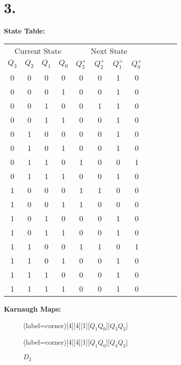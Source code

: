 \documentclass[a4paper,12pt]{article}
\begin{document}
\section*{3.}

\textbf{State Table:}

\begin{center}
	\begin{tabular}{cccccccccccc}
		\toprule
		\multicolumn{4}{c}{Current State} & \multicolumn{4}{c}{Next State} \\
		\cmidrule(lr){1-4} \cmidrule(lr){5-8}
		$Q_3$ & $Q_2$ & $Q_1$ & $Q_0$ & $Q_3^+$ & $Q_2^+$ & $Q_1^+$ & $Q_0^+$ \\
		\midrule
		0 & 0 & 0 & 0 & 0 & 0 & 1 & 0 \\ 
        0 & 0 & 0 & 1 & 0 & 0 & 1 & 0 \\ 
        0 & 0 & 1 & 0 & 0 & 1 & 1 & 0 \\ 
        0 & 0 & 1 & 1 & 0 & 0 & 1 & 0 \\ 
        0 & 1 & 0 & 0 & 0 & 0 & 1 & 0 \\ 
        0 & 1 & 0 & 1 & 0 & 0 & 1 & 0 \\ 
        0 & 1 & 1 & 0 & 1 & 0 & 0 & 1 \\ 
        0 & 1 & 1 & 1 & 0 & 0 & 1 & 0 \\ 
        1 & 0 & 0 & 0 & 1 & 1 & 0 & 0 \\ 
        1 & 0 & 0 & 1 & 1 & 0 & 0 & 0 \\ 
        1 & 0 & 1 & 0 & 0 & 0 & 1 & 0 \\ 
        1 & 0 & 1 & 1 & 0 & 0 & 1 & 0 \\ 
        1 & 1 & 0 & 0 & 1 & 1 & 0 & 1 \\ 
        1 & 1 & 0 & 1 & 0 & 0 & 1 & 0 \\ 
        1 & 1 & 1 & 0 & 0 & 0 & 1 & 0 \\ 
        1 & 1 & 1 & 1 & 0 & 0 & 1 & 0 \\ 
		\bottomrule
	\end{tabular}
\end{center}

\newpage
\textbf{Karnaugh Maps:}

\begin{figure}[H]
	\begin{minipage}{0.5\linewidth}
		\centering
		\begin{karnaugh-map}(label=corner)[4][4][1][$Q_1Q_0$][$Q_3Q_2$]
		\end{karnaugh-map}
		\caption*{$D_3$}
	\end{minipage}
	\begin{minipage}{0.5\linewidth}
		\centering
		\begin{karnaugh-map}(label=corner)[4][4][1][$Q_1Q_0$][$Q_3Q_2$]
		\end{karnaugh-map}
		\caption*{$D_2$}
	\end{minipage}
\end{figure}
\end{document}
